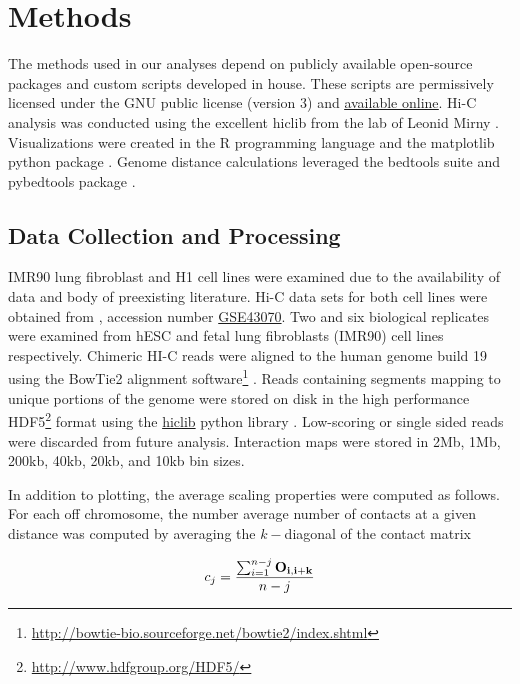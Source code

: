 \chapter{Methods}

The methods used in our analyses depend on publicly available open-source packages and custom scripts developed in house.
These scripts are permissively licensed under the GNU public license (version 3) and
\href{https://github.com/New-College-of-Florida/Jonathan-Niles-Thesis}{\underline{available online}}.  Hi-C analysis was conducted using
the excellent hiclib from the lab of Leonid Mirny \citep{imakaev2012}.  Visualizations were created in the R programming
language \citep{r2014} and the matplotlib python package \citep{hunter2007}.  Genome distance calculations leveraged the
bedtools suite \citep{quinlan2010} and pybedtools package \citep{dale2011}.

\section*{Data Collection and Processing}

IMR90 lung fibroblast and H1  cell lines were examined due to the availability of data and body of preexisting
literature.  Hi-C data sets for both cell lines were obtained from  \citep{edgar2002}, accession number
\href{http://www.ncbi.nlm.nih.gov/geo/query/acc.cgi?acc=GSE43070}{GSE43070}.  Two and six biological replicates were examined from
\gls{hESC} and fetal lung fibroblasts (IMR90) cell lines respectively.  Chimeric HI-C reads were aligned to the human genome build 19 using the BowTie2
alignment software\footnote{\url{http://bowtie-bio.sourceforge.net/bowtie2/index.shtml}} \citep{langmead2012}. Reads containing
segments mapping to unique portions of the genome were stored on disk in the high performance
HDF5\footnote{\url{http://www.hdfgroup.org/HDF5/}} format using the \href{https://bitbucket.org/mirnylab/hiclib}{hiclib} python
library \citep{imakaev2012}.  Low-scoring or single sided reads were discarded from future analysis.  Interaction maps were
stored in 2Mb, 1Mb, 200kb, 40kb, 20kb, and 10kb bin sizes.

In addition to plotting, the average scaling properties were computed as follows.  For each off chromosome, the number average
number of contacts at a given distance was computed by averaging the $k-$diagonal of the contact matrix

\begin{align}
  c_j = \frac{\sum_{i=1}^{n - j} \mathbf{O_{i, i+k}}}{n - j} \label{eq:probeScale}
\end{align}

